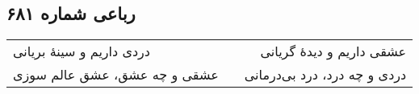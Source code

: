 \begin{center}
\section*{رباعی شماره ۶۸۱}
\label{sec:sh681}
\begin{longtable}{l p{0.5cm} r}
دردی داریم و سینهٔ بریانی
&&
عشقی داریم و دیدهٔ گریانی
\\
عشقی و چه عشق، عشق عالم سوزی
&&
دردی و چه درد، درد بی‌درمانی
\\
\end{longtable}
\end{center}
